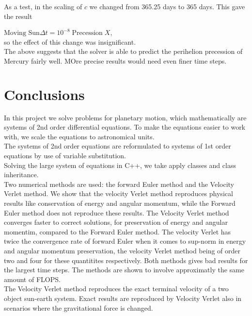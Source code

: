 \documentclass{article}
\begin{document}
As a test, in the scaling of $c$ we changed from 365.25 days to 365 days. This gave the result

$\text{Moving Sun} \Delta t = 10^{-8}\; \text{Precession}\; X$,\\

so the effect of this change was insignificant.\\

The above suggests that the solver is able to predict the perihelion precession of Mercury fairly well. MOre precise results would need even finer time steps.

\section{Conclusions}
In this project we solve problems for planetary motion, which mathematically are systems of 2nd order differential equations. To make the equations easier to work with, we scale the equations to astronomical units.\\

The systems of 2nd order equations are reformulated to systems of 1st order equations by use of variable substitution. \\

Solving the large system of equations in C++, we take apply classes and class inheritance.\\

Two numerical methods are used: the forward Euler method and the Velocity Verlet method. We show that the velocity Verlet method reproduces physical results like conservation of energy and angular momentum, while the Forward Euler method does not reproduce these results. The Velocity Verlet method converges faster to correct solutions, for preservation of energy and angular momentim, compared to the Forward Euler method. The velocity Verlet has twice the convergence rate of forward Euler when it comes to sup-norm in energy and angular momentum preservation, the velocity Verlet method being of order two and four for these quantitites respectively. Both methods gives bad results for the largest time steps. The methods are shown to involve approximatly the same amount of FLOPS.\\

The Velocity Verlet method reproduces the exact terminal velocity of a two object sun-earth system. Exact results are reproduced by Velocity Verlet also in scenarios where the gravitational force is changed. \\
\end{document}
